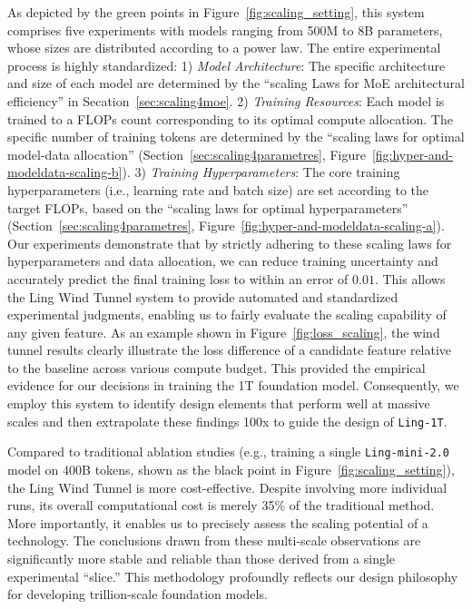 \documentclass[table]{gtech}
\theoremstyle{definition}
\begin{document}
As depicted by the green points in Figure~\ref{fig:scaling_setting}, this system comprises five experiments with models ranging from 500M to 8B parameters, whose sizes are distributed according to a power law. The entire experimental process is highly standardized:
1) \textit{Model Architecture}: The specific architecture and size of each model are determined by the ``scaling Laws for MoE architectural efficiency'' in Secation~\ref{sec:scaling4moe}. 
2) \textit{Training Resources}: Each model is trained to a FLOPs count corresponding to its optimal compute allocation. The specific number of training tokens are determined by the ``scaling laws for optimal model-data allocation'' (Section~\ref{sec:scaling4parametres}, Figure~\ref{fig:hyper-and-modeldata-scaling-b}).
3) \textit{Training Hyperparameters}: The core training hyperparameters (i.e., learning rate and batch size) are set according to the target FLOPs, based on the ``scaling laws for optimal hyperparameters'' (Section~\ref{sec:scaling4parametres}, Figure~\ref{fig:hyper-and-modeldata-scaling-a}). 
Our experiments demonstrate that by strictly adhering to these scaling laws for hyperparameters and data allocation, we can reduce training uncertainty and accurately predict the final training loss to within an error of $0.01$. This allows the Ling Wind Tunnel system to provide automated and standardized experimental judgments, enabling us to fairly evaluate the scaling capability of any given feature. As an example shown in Figure~\ref{fig:loss_scaling}, the wind tunnel results clearly illustrate the loss difference of a candidate feature relative to the baseline across various compute budget. This provided the empirical evidence for our decisions in training the 1T foundation model. Consequently, we employ this system to identify design elements that perform well at massive scales and then extrapolate these findings 100x to guide the design of \texttt{Ling-1T}.

Compared to traditional ablation studies (e.g., training a single \texttt{\texttt{Ling-mini-2.0}} model on 400B tokens, shown as the black point in Figure~\ref{fig:scaling_setting}), the Ling Wind Tunnel is more cost-effective. Despite involving more individual runs, its overall computational cost is merely 35\% of the traditional method. More importantly, it enables us to precisely assess the scaling potential of a technology. The conclusions drawn from these multi-scale observations are significantly more stable and reliable than those derived from a single experimental ``slice.'' This methodology profoundly reflects our design philosophy for developing trillion-scale foundation models.
\end{document}
